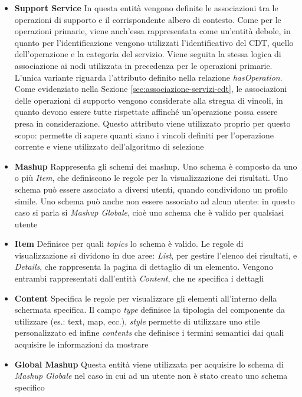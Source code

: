\begin{itemize}
	\item \textbf{Support Service} In questa entità vengono definite le associazioni tra le operazioni di supporto e il corrispondente albero di contesto. Come per le operazioni primarie, viene anch'essa rappresentata come un'entità debole, in quanto per l'identificazione vengono utilizzati l'identificativo del CDT, quello dell'operazione e la categoria del servizio. Viene seguita la stessa logica di associazione ai nodi utilizzata in precedenza per le operazioni primarie. L'unica variante riguarda l'attributo  definito nella relazione \emph{hasOperation}. Come evidenziato nella Sezione \ref{sec:associazione-servizi-cdt}, le associazioni delle operazioni di supporto vengono considerate alla stregua di vincoli, in quanto devono essere tutte rispettate affinché un'operazione possa essere presa in considerazione. Questo attributo viene utilizzato proprio per questo scopo: permette di sapere quanti siano i vincoli definiti per l'operazione corrente e viene utilizzato dell'algoritmo di selezione
	\item \textbf{Mashup} Rappresenta gli schemi dei mashup. Uno schema è composto da uno o più \emph{Item}, che definiscono le regole per la visualizzazione dei risultati. Uno schema può essere associato a diversi utenti, quando condividono un profilo simile. Uno schema può anche non essere associato ad alcun utente: in questo caso si parla si \emph{Mashup Globale}, cioè uno schema che è valido per qualsiasi utente
	\item \textbf{Item} Definisce per quali \emph{topics} lo schema è valido. Le regole di visualizzazione si dividono in due aree: \emph{List}, per gestire l'elenco dei risultati, e \emph{Details}, che rappresenta la pagina di dettaglio di un elemento. Vengono entrambi rappresentati dall'entità \emph{Content}, che ne specifica i dettagli
	\item \textbf{Content} Specifica le regole per visualizzare gli elementi all'interno della schermata specifica. Il campo \emph{type} definisce la tipologia del componente da utilizzare (es.: text, map, ecc.), \emph{style} permette di utilizzare uno stile personalizzato ed infine \emph{contents} che definisce i termini semantici dai quali acquisire le informazioni da mostrare
	\item \textbf{Global Mashup} Questa entità viene utilizzata per acquisire lo schema di \emph{Mashup Globale} nel caso in cui ad un utente non è stato creato uno schema specifico
\end{itemize}


